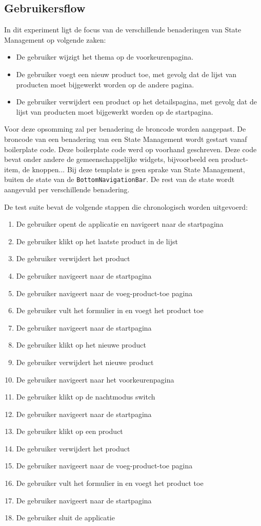 \subsection{Gebruikersflow}
\label{ch:user-flow}
In dit experiment ligt de focus van de verschillende benaderingen van State Management op volgende zaken: 
\begin{itemize}
    \item De gebruiker wijzigt het thema op de voorkeurenpagina.
    \item De gebruiker voegt een nieuw product toe, met gevolg dat de lijst van producten moet bijgewerkt worden op de andere pagina.
    \item De gebruiker verwijdert een product op het detailspagina, met gevolg dat de lijst van producten moet bijgewerkt worden op de startpagina.
\end{itemize}
Voor deze opsomming zal per benadering de broncode worden aangepast. De broncode van een benadering van een State Management wordt gestart vanaf boilerplate code. Deze boilerplate code werd op voorhand geschreven. Deze code bevat onder andere de gemeenschappelijke widgets, bijvoorbeeld een product-item, de knoppen...
Bij deze template is geen sprake van State Management, buiten de state van de \verb|BottomNavigationBar|. De rest van de state wordt aangevuld per verschillende benadering.

De test suite bevat de volgende stappen die chronologisch worden uitgevoerd:
\begin{enumerate}
    \item De gebruiker opent de applicatie en navigeert naar de startpagina
    \item De gebruiker klikt op het laatste product in de lijst
    \item De gebruiker verwijdert het product
    \item De gebruiker navigeert naar de startpagina
    \item De gebruiker navigeert naar de voeg-product-toe pagina
    \item De gebruiker vult het formulier in en voegt het product toe
    \item De gebruiker navigeert naar de startpagina
    \item De gebruiker klikt op het nieuwe product
    \item De gebruiker verwijdert het nieuwe product
    \item De gebruiker navigeert naar het voorkeurenpagina
    \item De gebruiker klikt op de nachtmodus switch
    \item De gebruiker navigeert naar de startpagina
    \item De gebruiker klikt op een product
    \item De gebruiker verwijdert het product
    \item De gebruiker navigeert naar de voeg-product-toe pagina
    \item De gebruiker vult het formulier in en voegt het product toe
    \item De gebruiker navigeert naar de startpagina
    \item De gebruiker sluit de applicatie
\end{enumerate}

